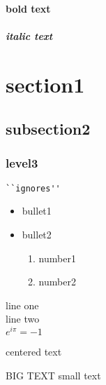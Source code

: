 \documentclass[10pt,a4paper]{article}
\begin{document}
\paragraph{\textbf{bold text}}
\paragraph{\textit{italic text}}
\section{section1}
\subsection{subsection2}
\subsubsection{level3}
\begin{verbatim}
``ignores''
\end{verbatim}
\begin{itemize}
\item bullet1
\item bullet2
\begin{enumerate}
\item number1
\item number2
\end{enumerate}
\end{itemize}
line one \\ line two \\
$e^{i \pi} = -1$
\begin{center}
centered text
\end{center}
{\large BIG TEXT}
{\small small text}
\end{document}
